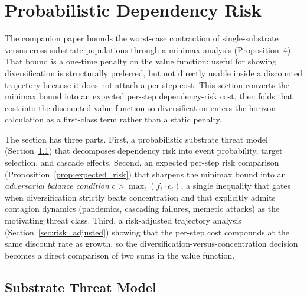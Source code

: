 \section{Probabilistic Dependency Risk}
\label{sec:dependency}

The companion paper \citep{lasser2026horizon} bounds the worst-case
contraction of single-substrate versus cross-substrate populations
through a minimax analysis (Proposition~4). That bound is a
one-time penalty on the value function: useful for showing
diversification is structurally preferred, but not directly usable
inside a discounted trajectory because it does not attach a per-step
cost. This section converts the minimax bound into an expected
per-step dependency-risk cost, then folds that cost into the
discounted value function so diversification enters the horizon
calculation as a first-class term rather than a static penalty.

The section has three parts. First, a probabilistic substrate threat
model (Section~\ref{sec:threat_model_below}) that decomposes
dependency risk into event probability, target selection, and cascade
effects. Second, an expected per-step risk comparison
(Proposition~\ref{prop:expected_risk}) that sharpens the minimax
bound into an \emph{adversarial balance condition} $c > \max_i (f_i
\cdot c_i)$, a single inequality that gates when diversification
strictly beats concentration and that explicitly admits contagion
dynamics (pandemics, cascading failures, memetic attacks) as the
motivating threat class. Third, a risk-adjusted trajectory analysis
(Section~\ref{sec:risk_adjusted}) showing that the per-step cost
compounds at the same discount rate as growth, so the
diversification-versus-concentration decision becomes a direct
comparison of two sums in the value function.

\subsection{Substrate Threat Model}
\label{sec:threat_model_below}


